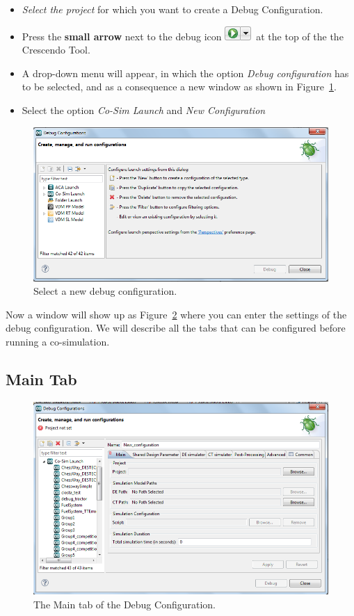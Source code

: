 \documentclass{crescendorepchap}
\begin{document}
\begin{itemize}
\item
  \emph{Select the project} for which you want to create a Debug
  Configuration.
\item
  Press the \textbf{small arrow} next to the debug icon
  \includegraphics{images/DestecsDebugButtonArrow.png}~at the top of the
  the Crescendo Tool.
\item
  A drop-down menu will appear, in which the option
  \emph{Debug configuration} has to be selected, and as a consequence
a new window as shown in Figure~\ref{fig:DestecsDebugConfigurationNew}.
\item
  Select the option \emph{Co-Sim Launch} and
  \emph{New Configuration}
\end{itemize}

\begin{figure}[htbp]
\centering
\includegraphics[width=.6\textwidth]{images/DestecsDebugConfigurationNew.png}
\caption{Select a new debug configuration.\label{fig:DestecsDebugConfigurationNew}}
\end{figure}

Now a window will show up as Figure~\ref{fig:DestecsDebugConfigurationMain}
where you can enter the settings of the debug
configuration. We will describe all the tabs that can be configured before running a
co-simulation.

\subsection{Main Tab}

\begin{figure}[htbp]
\centering
\includegraphics[width=.8\textwidth]{images/DestecsDebugConfigurationMain.png}
\caption{The Main tab of the Debug Configuration.\label{fig:DestecsDebugConfigurationMain}}
\end{figure}
\end{document}
